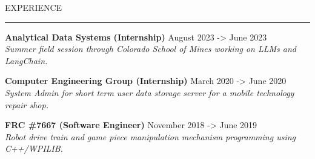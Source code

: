 \documentclass[10pt,letterpaper]{article}
\newcommand{\customtext}[2]{%
    {\fontsize{#1}{\dimexpr #1pt+2pt}\selectfont #2}%
}
\begin{document}
\begin{flushleft}
    \textcolor{headercolor}{\customtext{14}{EXPERIENCE}}
    \textcolor{gray}{\rule{\textwidth}{2pt}}

    {\customtext{12}{\textbf{Analytical Data Systems (Internship)}} \hfill \customtext{12}{August 2023 -> June 2023}} \\
    \customtext{10}{\textit{Summer field session through Colorado School of Mines working on LLMs and LangChain.}}
    \vspace{14pt}

    {\customtext{12}{\textbf{Computer Engineering Group (Internship)}} \hfill \customtext{12}{March 2020 -> June 2020}} \\
    \customtext{10}{\textit{System Admin for short term user data storage server for a mobile technology repair shop.}}
    \vspace{14pt}

    {\customtext{12}{\textbf{FRC \#7667 (Software Engineer)}} \hfill \customtext{12}{November 2018 -> June 2019}} \\
    \customtext{10}{\textit{Robot drive train and game piece manipulation mechanism programming using C++/WPILIB.}}
    \vspace{14pt}

\end{flushleft}
\end{document}
